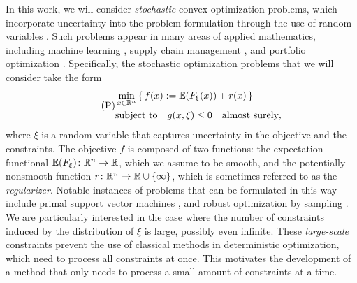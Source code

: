 In this work, we will consider
\textit{stochastic} convex optimization problems, which incorporate uncertainty
into the problem formulation through the use of random variables
\cite{robbins1951stochastic,birge2011introduction}.
Such problems appear in many areas of
applied mathematics, including machine learning \cite{bottou2018optimization},
supply chain management \cite{santoso2005stochastic}, and
portfolio optimization \cite{mulvey1995robust}.
Specifically, the stochastic optimization problems that we will consider
take the form
\begin{equation}
    \label{eq:main-problem}
    \tag{P}
    \begin{aligned}
    &\min_{x \in \mathbb{R}^n} \, \{\, f(x) := \mathbb{E}(F_\xi(x)) + r(x) \,\} \\
    &\textup{subject to} \quad g(x,\xi) \leq 0 \quad \textnormal{almost surely},
    \end{aligned}
\end{equation}
where $\xi$ is a random variable that captures uncertainty in the objective and
the constraints.
The objective $f$ is composed of two functions: the expectation
functional $\mathbb{E}(F_\xi)\colon\mathbb{R}^n\to\mathbb{R}$, which we assume to
be smooth, and the potentially nonsmooth function $r\colon\mathbb{R}^n\to\mathbb{R}\cup\{\infty\}$,
which is sometimes referred to as the \textit{regularizer}.
Notable instances of problems that can be formulated in this way
include primal support vector machines \cite{fercoq2019almost,hastie2009elements}, and
robust optimization by sampling \cite{ben2009robust,calafiore2005uncertain,xu2020primal}.
We are particularly interested in the case where the number of constraints
induced by the distribution of $\xi$ is large, possibly even infinite.
These \textit{large-scale} constraints prevent the use of classical methods
in deterministic optimization, which need to process all constraints at once.
This motivates the development of a method that only needs to process
a small amount of constraints at a time.



